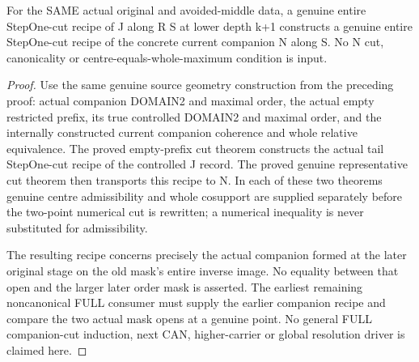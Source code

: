 \begin{theorem}
\label{hir:original-bound-two-companion-stepone-rebase-cut}
\leanok
For the SAME actual original and avoided-middle data, a genuine entire
StepOne-cut recipe of J along R S at lower depth k+1 constructs a genuine
entire StepOne-cut recipe of the concrete current companion N along S.
No N cut, canonicality or centre-equals-whole-maximum condition is input.
\end{theorem}
\begin{proof}
Use the same genuine source geometry construction from the preceding
proof: actual companion DOMAIN2 and maximal order, the actual empty
restricted prefix, its true controlled DOMAIN2 and maximal order, and
the internally constructed current companion coherence and whole relative
equivalence. The proved empty-prefix cut theorem constructs the actual
tail StepOne-cut recipe of the controlled J record. The proved genuine
representative cut theorem then transports this recipe to N. In each of
these two theorems genuine centre admissibility and whole cosupport are
supplied separately before the two-point numerical cut is rewritten;
a numerical inequality is never substituted for admissibility.

The resulting recipe concerns precisely the actual companion formed at
the later original stage on the old mask's entire inverse image. No
equality between that open and the larger later order mask is asserted.
The earliest remaining noncanonical FULL consumer must supply the earlier
companion recipe and compare the two actual mask opens at a genuine point.
No general FULL companion-cut induction, next CAN, higher-carrier or
global resolution driver is claimed here.
\end{proof}
